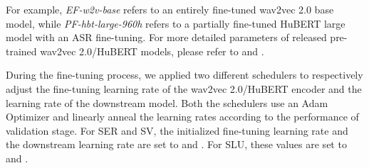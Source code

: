 \documentclass{article}
\begin{document}
For example, \textit{EF-w2v-base} refers to an entirely fine-tuned wav2vec 2.0 base model, while \textit{PF-hbt-large-960h} refers to a partially fine-tuned HuBERT large model with an ASR fine-tuning. For more detailed parameters of released pre-trained wav2vec 2.0/HuBERT models, please refer to \cite{wav2vec2} and \cite{HuBERT}.

During the fine-tuning process, we applied two different schedulers to respectively adjust the fine-tuning learning rate of the wav2vec 2.0/HuBERT encoder and the learning rate of the downstream model. Both the schedulers use an Adam Optimizer and linearly anneal the learning rates according to the performance of validation stage. For SER and SV, the initialized fine-tuning learning rate and the downstream learning rate are set to  and . For SLU, these values are set to  and .
\end{document}
